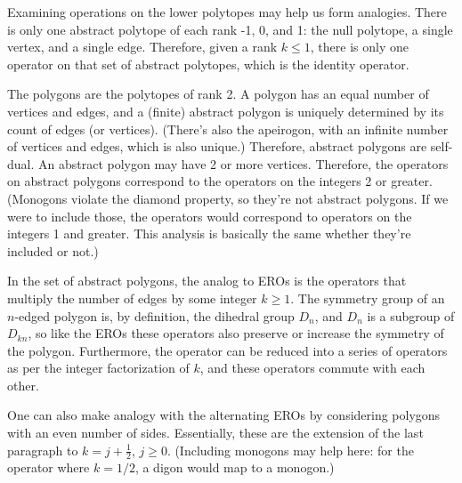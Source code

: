 \documentclass{amsart}[12pt]
\begin{document}
Examining operations on the lower polytopes may help us form analogies.
There is only one abstract polytope of each rank -1, 0, and 1:
the null polytope, a single vertex, and a single edge. Therefore,
given a rank $k \le 1$, there is only one operator on that set of abstract
polytopes, which is the identity operator.

The polygons are the polytopes of rank 2. A polygon has an equal number of
vertices and edges, and a (finite) abstract polygon is uniquely determined by
its count of edges (or vertices). (There's also the apeirogon, with an infinite
number of vertices and edges, which is also unique.) Therefore, abstract
polygons are self-dual. An abstract polygon may have 2 or more vertices.
Therefore, the operators on abstract polygons correspond to the operators on
the integers 2 or greater. (Monogons violate the diamond property, so they're
not abstract polygons. If we were to include those, the operators would
correspond to operators on the integers 1 and greater.
This analysis is basically the same whether they're included or not.)

In the set of abstract polygons, the analog to EROs is the operators that
multiply the number of edges by some integer $k \ge 1$. The symmetry group of
an $n$-edged polygon is, by definition, the dihedral group $D_n$, and $D_n$ is
a subgroup of $D_{kn}$, so like the EROs these operators also preserve or
increase the symmetry of the polygon. Furthermore, the operator can be reduced
into a series of operators as per the integer factorization of $k$, and these
operators commute with each other.

One can also make analogy with the alternating EROs by considering polygons
with an even number of sides. Essentially, these are the extension of the last
paragraph to $k = j + \frac{1}{2}$, $j \ge 0$. (Including monogons may help
here: for the operator where $k=1/2$, a digon would map to a monogon.)
\end{document}

